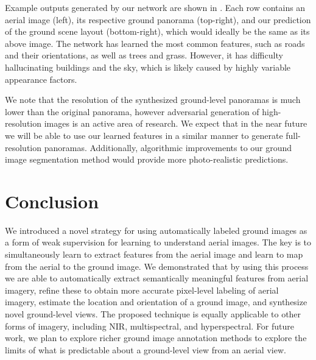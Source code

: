 Example outputs generated by our network are shown in . Each row 
contains an aerial image (left), its respective ground panorama (top-right), 
and our prediction of the ground scene layout (bottom-right), which would 
ideally be the same as its above image. The network has learned the most common 
features, such as roads and their orientations, as well as trees and grass. 
However, it has difficulty hallucinating buildings and the sky, which is likely 
caused by highly variable appearance factors.

We note that the resolution of the synthesized ground-level panoramas is much 
lower than the original panorama, however adversarial generation of 
high-resolution images is an active area of research. We expect that in the 
near future we will be able to use our learned features in a similar manner to 
generate full-resolution panoramas. Additionally, algorithmic improvements to 
our ground image segmentation method would provide more photo-realistic 
predictions.



\section{Conclusion}

We introduced a novel strategy for using automatically labeled ground
images as a form of weak supervision for learning to understand aerial
images. The key is to simultaneously learn to extract features from
the aerial image and learn to map from the aerial to the ground image.
We demonstrated that by using this process we are able to
automatically extract semantically meaningful features from aerial
imagery, refine these to obtain more accurate pixel-level labeling of
aerial imagery, estimate the location and orientation of a ground
image, and synthesize novel ground-level views.  The proposed
technique is equally applicable to other forms of imagery, including
NIR, multispectral, and hyperspectral. For future work, we plan to
explore richer ground image annotation methods to explore the limits
of what is predictable about a ground-level view from an aerial view.
